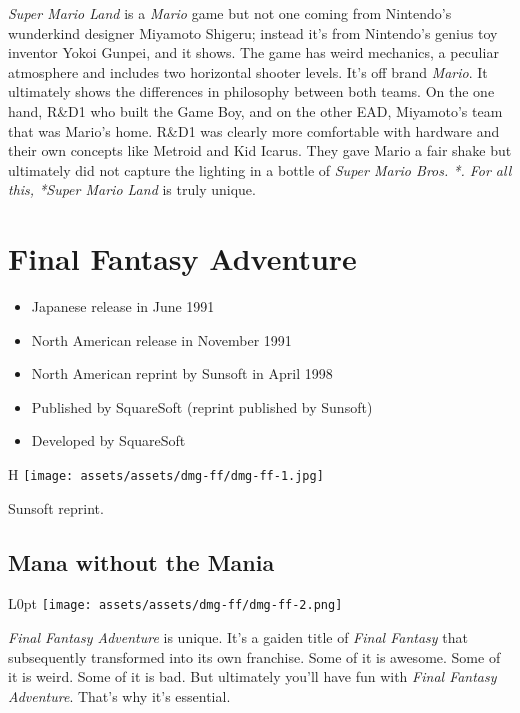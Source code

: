 \documentclass{book}
\begin{document}
\emph{Super Mario Land} is a \emph{Mario} game but not one coming from Nintendo’s wunderkind designer Miyamoto Shigeru; instead it’s from Nintendo’s genius toy inventor Yokoi Gunpei, and it shows. The game has weird mechanics, a peculiar atmosphere and includes two horizontal shooter levels. It’s off brand \emph{Mario}. It ultimately shows the differences in philosophy between both teams. On the one hand, R\&D1 who built the Game Boy, and on the other EAD, Miyamoto’s team that was Mario’s home. R\&D1 was clearly more comfortable with hardware and their own concepts like Metroid and Kid Icarus. They gave Mario a fair shake but ultimately did not capture the lighting in a bottle of \emph{Super Mario Bros. *. For all this, *Super Mario Land} is truly unique.


\begingroup \chapter*{Final Fantasy Adventure} \endgroup

\begin{itemize} \setlength\itemsep{-0.4em}
\item Japanese release in June 1991
\item North American release in November 1991
\item North American reprint by Sunsoft in April 1998
\item Published by SquareSoft (reprint published by Sunsoft)
\item Developed by SquareSoft
\end{itemize}\noindent

\begin{wrapfigure}{H}{\linewidth}
\vskip 4pt
\centering \texttt{[image: assets/assets/dmg-ff/dmg-ff-1.jpg]}\par{} Sunsoft reprint.\end{wrapfigure}
\clearpage

\FloatBarrier\needspace{5pt}\section*{Mana without the Mania}\nopagebreak[4]

\begin{wrapfigure}{L}{0pt} \texttt{[image: assets/assets/dmg-ff/dmg-ff-2.png]}\end{wrapfigure}
\emph{Final Fantasy Adventure} is unique. It’s a gaiden title of \emph{Final Fantasy} that subsequently transformed into its own franchise. Some of it is awesome. Some of it is weird. Some of it is bad. But ultimately you’ll have fun with \emph{Final Fantasy Adventure}. That’s why it’s essential.
\end{document}
